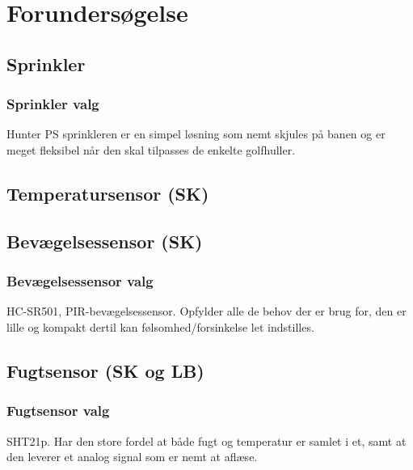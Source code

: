 \chapter{Forundersøgelse}

\section{Sprinkler}								%

\subsection{Sprinkler valg}						%
Hunter PS sprinkleren er en simpel løsning som nemt skjules på banen og er meget fleksibel når den skal tilpasses de enkelte golfhuller.

\newpage
\section{Temperatursensor (SK)}						


\section{Bevægelsessensor (SK)}						

\subsection{Bevægelsessensor valg}				%
HC-SR501, PIR-bevægelsessensor. Opfylder alle de behov der er brug for, den er lille og kompakt dertil kan følsomhed/forsinkelse let indstilles.

\newpage
\section{Fugtsensor (SK og LB)}						

\subsection{Fugtsensor valg}						%
SHT21p. Har den store fordel at både fugt og temperatur er samlet i et, samt at den leverer et analog signal som er nemt at aflæse. 